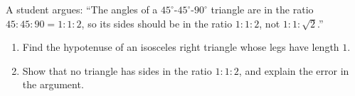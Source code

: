 A student argues: ``The angles of a $45^\circ$-$45^\circ$-$90^\circ$ triangle are in the ratio $45:45:90=1:1:2$, so its sides should be in the ratio $1:1:2$, not $1:1:\sqrt2$.''
\begin{enumerate}
\item[(a)] Find the hypotenuse of an isosceles right triangle whose legs have length $1$.
\item[(b)] Show that no triangle has sides in the ratio $1:1:2$, and explain the error in the argument.
\end{enumerate}
